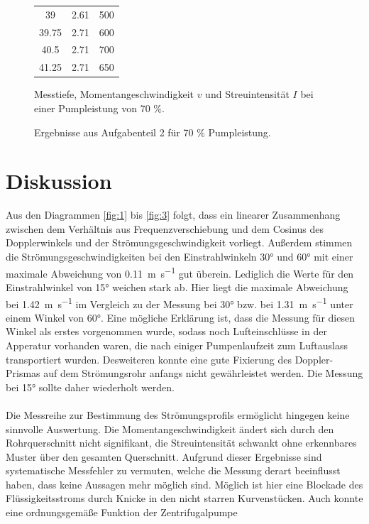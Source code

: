 \begin{figure}
\begin{subtable}{0.4\textwidth}
\begin{tabular}{c c c}
          39 & 2.61 & 500 \\
          39.75 & 2.71 & 600 \\
          40.5 & 2.71 & 700 \\
          41.25 & 2.71 & 650 \\
          \bottomrule
        \end{tabular}
        \caption{Messtiefe, Momentangeschwindigkeit $v$ und Streuintensität $I$ bei einer
        Pumpleistung von 70 $\%$.}
        \label{tab:6}
        \qquad
      \end{subtable}
      \caption{Ergebnisse aus Aufgabenteil 2 für 70 $\%$ Pumpleistung.}
    \end{figure}


\section{Diskussion}
Aus den Diagrammen \ref{fig:1} bis \ref{fig:3} folgt, dass ein linearer Zusammenhang
zwischen dem Verhältnis aus Frequenzverschiebung und dem Cosinus des Dopplerwinkels und
der Strömungsgeschwindigkeit vorliegt. Außerdem stimmen die Strömungsgeschwindigkeiten bei
den Einstrahlwinkeln 30° und 60° mit einer maximale Abweichung von \SI{0.11}{\meter\per\second}
gut überein. Lediglich die Werte für den Einstrahlwinkel von 15° weichen stark ab. Hier liegt die
maximale Abweichung bei \SI{1.42}{\meter\per\second} im Vergleich zu der Messung bei 30°
bzw. bei \SI{1.31}{\meter\per\second} unter einem Winkel von 60°. Eine mögliche
Erklärung ist, dass die Messung für diesen Winkel als erstes vorgenommen wurde, sodass
noch Lufteinschlüsse in der Apperatur vorhanden waren, die nach einiger Pumpenlaufzeit
zum Luftauslass transportiert wurden. Desweiteren konnte eine gute Fixierung des Doppler-Prismas
auf dem Strömungsrohr anfangs nicht gewährleistet werden. Die Messung bei 15° sollte
daher wiederholt werden.\\
\\
Die Messreihe zur Bestimmung des Strömungsprofils ermöglicht hingegen keine sinnvolle
Auswertung. Die Momentangeschwindigkeit ändert sich durch den Rohrquerschnitt nicht
signifikant, die Streuintensität schwankt ohne erkennbares Muster über den gesamten
Querschnitt. Aufgrund dieser Ergebnisse sind systematische Messfehler zu vermuten,
welche die Messung derart beeinflusst haben, dass keine Aussagen mehr möglich sind.
Möglich ist hier eine Blockade des Flüssigkeitsstroms durch Knicke in den nicht
starren Kurvenstücken. Auch konnte eine ordnungsgemäße Funktion der Zentrifugalpumpe
